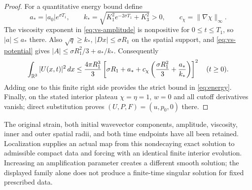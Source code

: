 \begin{proof}
For a quantitative energy bound define
\[
 a_* =|a_0|e^{\sigma T_1},\qquad
 k_* =\sqrt{K_1^2e^{-2\sigma T_1}+K_3^2}>0,
 \qquad c_\chi=\|\nabla\chi\|_\infty.
\]
The viscosity exponent in \eqref{eq:vs-amplitude} is nonpositive for
$0\leq t\leq T_1$, so $|a|\leq a_*$ there. Also
$\sqrt q\geq k_*$, $|Dx|\leq\sigma R_1$ on the spatial support,
and \eqref{eq:vs-potential} gives
$|A|\leq\sigma R_1^2/3+a_*/k_*$. Consequently
\[
 \int_{\mathbb R^3}|U(x,t)|^2\,dx
 \leq\frac{4\pi R_1^3}{3}
 \left[\sigma R_1+a_*+
 c_\chi\left(\frac{\sigma R_1^2}{3}+\frac{a_*}{k_*}\right)\right]^2
 \quad(t\geq0).
\]
Adding one to this finite right side provides the strict bound in
\eqref{eq:energy}. Finally, on the stated interior plateau
$\chi=\eta=1$, $w=0$ and all cutoff derivatives vanish; direct
substitution proves $(U,P,F)=(u,p_0,0)$ there.
\end{proof}

The original strain, both initial wavevector components, amplitude,
viscosity, inner and outer spatial radii, and both time endpoints have
all been retained. Localization supplies an actual map from this
nondecaying exact solution to admissible compact data and forcing with an
identical finite interior evolution. Increasing an amplification parameter
creates a different smooth solution; the displayed family alone does not
produce a finite-time singular solution for fixed prescribed data.
